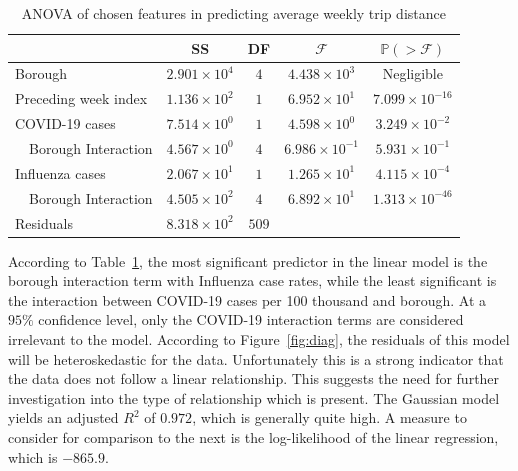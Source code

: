 \documentclass[11pt]{article}
\begin{document}
\begin{table}[H]
    \centering
    \caption{ANOVA of chosen features in predicting average weekly trip distance}
    \label{tbl:anova1}
    \begin{tabular}{llcccc}
    \hline
                  &                                     & SS                        & DF            & $\mathcal{F}$             & $\mathbb{P}(>\mathcal{F})$        \\ \hline
    \multicolumn{2}{l}{Borough}                         & $2.901 \times 10^{4}$     & $4  $         & $4.438 \times 10^{3}$     & Negligible          \\ \hline
    \multicolumn{2}{l}{Preceding week index}            & $1.136 \times 10^{2}$     & $1  $         & $6.952 \times 10^{1}$     & $7.099 \times 10^{-16 }$          \\ \hline
    \multicolumn{2}{l}{COVID-19 cases}                  & $7.514 \times 10^{0}$     & $1  $         & $4.598 \times 10^{0}$     & $3.249 \times 10^{-2  }$          \\ \hline
                  & Borough Interaction                 & $4.567 \times 10^{0}$     & $4  $         & $6.986 \times 10^{-1}$    & $5.931 \times 10^{-1  }$          \\ \hline
    \multicolumn{2}{l}{Influenza cases}                 & $2.067 \times 10^{1}$     & $1  $         & $1.265 \times 10^{1}$     & $4.115 \times 10^{-4  }$          \\ \hline
                  & Borough Interaction                 & $4.505 \times 10^{2}$     & $4  $         & $6.892 \times 10^{1}$     & $1.313 \times 10^{-46 }$          \\ \hline
    \multicolumn{2}{l}{Residuals}                       & $8.318 \times 10^{2}$     & $509$         &                           &                                   \\ \hline
    \end{tabular}
\end{table}

    According to Table~\ref{tbl:anova1}, the most significant predictor in the linear model is the borough
    interaction term with Influenza case rates,
    while the least significant is the interaction between COVID-19 cases per 100 thousand and borough.
    At a $95\%$ confidence level, only the COVID-19 interaction terms are considered irrelevant to the model.
    According to Figure~\ref{fig:diag}, the residuals of this model will be heteroskedastic for the data.
    Unfortunately this is a strong indicator that the data does not follow a linear relationship.
    This suggests the need for further investigation into the type of relationship which is present.
    The Gaussian model yields an adjusted $R^2$ of $0.972$, which is generally quite high.
    A measure to consider for comparison to the next is the log-likelihood of the linear regression,
    which is $-865.9$.
\end{document}
